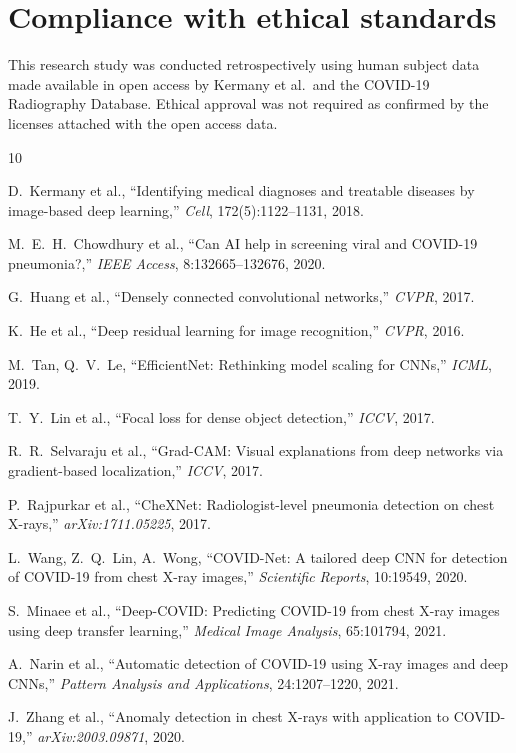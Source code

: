 \documentclass{article}
\begin{document}
\section{Compliance with ethical standards}
\label{sec:ethics}

This research study was conducted retrospectively using human subject data made
available in open access by Kermany et al.\ and the COVID-19 Radiography Database.
Ethical approval was not required as confirmed by the licenses attached with the open
access data.

\begin{thebibliography}{10}
\small

D.~Kermany et al., ``Identifying medical diagnoses and treatable diseases by
image-based deep learning,'' \textit{Cell}, 172(5):1122--1131, 2018.

M.~E.~H.~Chowdhury et al., ``Can AI help in screening viral and COVID-19 pneumonia?,''
\textit{IEEE Access}, 8:132665--132676, 2020.

G.~Huang et al., ``Densely connected convolutional networks,'' \textit{CVPR}, 2017.

K.~He et al., ``Deep residual learning for image recognition,'' \textit{CVPR}, 2016.

M.~Tan, Q.~V.~Le, ``EfficientNet: Rethinking model scaling for CNNs,'' \textit{ICML}, 2019.

T.~Y.~Lin et al., ``Focal loss for dense object detection,'' \textit{ICCV}, 2017.

R.~R.~Selvaraju et al., ``Grad-CAM: Visual explanations from deep networks via
gradient-based localization,'' \textit{ICCV}, 2017.

P.~Rajpurkar et al., ``CheXNet: Radiologist-level pneumonia detection on chest X-rays,''
\textit{arXiv:1711.05225}, 2017.

L.~Wang, Z.~Q.~Lin, A.~Wong, ``COVID-Net: A tailored deep CNN for detection of
COVID-19 from chest X-ray images,'' \textit{Scientific Reports}, 10:19549, 2020.

S.~Minaee et al., ``Deep-COVID: Predicting COVID-19 from chest X-ray images using
deep transfer learning,'' \textit{Medical Image Analysis}, 65:101794, 2021.

A.~Narin et al., ``Automatic detection of COVID-19 using X-ray images and deep CNNs,''
\textit{Pattern Analysis and Applications}, 24:1207--1220, 2021.

J.~Zhang et al., ``Anomaly detection in chest X-rays with application to COVID-19,''
\textit{arXiv:2003.09871}, 2020.

\end{thebibliography}
\end{document}

